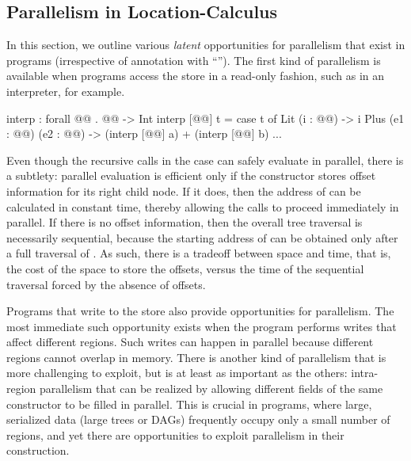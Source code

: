 \documentclass[acmsmall,acmthm=false,nonacm]{acmart}
\theoremstyle{straighttext0}
\theoremstyle{straighttext}
\begin{document}
\subsection{Parallelism in Location-Calculus}
\label{subsec:parallelism-in-local}

In this section, we outline various {\em latent} opportunities for parallelism
that exist in \seqcalc{} programs (irrespective of annotation with ``\il{$\partup$}'').
%
The first kind of parallelism is available when programs access
the store in a read-only fashion,
such as in an interpreter, for example.
%
\vspace{1mm}
%
\begin{code}
interp : forall @@ . @@ -> Int
interp [@@] t = case t of
  Lit (i : @@) -> i
  Plus (e1 : @@) (e2 : @@) ->
    (interp [@@] a) + (interp [@@] b)
  ...
\end{code}
%
Even though the recursive calls in the  case can
safely evaluate in parallel, there is a subtlety: parallel evaluation
is efficient only if the  constructor stores offset
information for its right child node.
%
If it does, then the address of  can be calculated in constant
time, thereby allowing the calls to proceed immediately in parallel.
%
If there is no offset information, then the overall tree traversal is
necessarily sequential, because the starting address of  can be
obtained only after a full traversal of .
%
As such, there is a tradeoff between space and time, that is, the cost
of the space to store the offsets, %
versus the time of the sequential traversal %
forced by the absence of offsets.

Programs that write to the store also provide opportunities for
parallelism.
%
The most immediate such opportunity exists when the program performs
writes that affect different regions.
%
Such writes can happen in parallel because different regions cannot overlap
in memory.
%
%
There is another kind of parallelism that is more challenging
to exploit, but is at least as important as the others:
%
intra-region parallelism that can be realized by allowing different fields
of the same constructor to be filled in parallel.
%
This is crucial in \seqcalc{} programs, where large, serialized data
(large trees or DAGs) frequently occupy only a small number of regions, and yet there are
opportunities to exploit parallelism in their construction.
\end{document}
